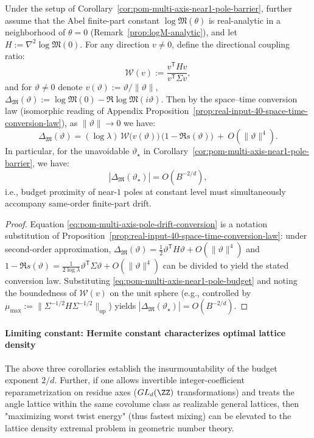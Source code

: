 \begin{corollary}\label{cor:pom-multi-axis-pole-drift-binding}
Under the setup of Corollary~\ref{cor:pom-multi-axis-near1-pole-barrier}, further assume that the Abel finite-part constant $\log\mathfrak{M}(\theta)$ is real-analytic in a neighborhood of $\theta=0$ (Remark~\ref{prop:logM-analytic}), and let
\(
H:=\nabla^2\log\mathfrak{M}(0)
\).
For any direction $v\neq 0$, define the directional coupling ratio:
\[
\mathcal{W}(v):=\frac{v^{\mathsf T}Hv}{v^{\mathsf T}\Sigma v},
\]
and for $\vartheta\neq 0$ denote $v(\vartheta):=\vartheta/\|\vartheta\|$, $\Delta_{\mathfrak{M}}(\vartheta):=\log\mathfrak{M}(0)-\Re\log\mathfrak{M}(i\vartheta)$.
Then by the space–time conversion law (isomorphic reading of Appendix Proposition~\ref{prop:real-input-40-space-time-conversion-law}), as $\|\vartheta\|\to 0$ we have:
\begin{equation}\label{eq:pom-multi-axis-pole-drift-conversion}
\Delta_{\mathfrak{M}}(\vartheta)
=(\log\lambda)\,\mathcal{W}\bigl(v(\vartheta)\bigr)\,\bigl(1-\Re s(\vartheta)\bigr)\ +\ O(\|\vartheta\|^4).
\end{equation}
In particular, for the unavoidable $\vartheta_\star$ in Corollary~\ref{cor:pom-multi-axis-near1-pole-barrier}, we have:
\[
|\Delta_{\mathfrak{M}}(\vartheta_\star)|=O(B^{-2/d}),
\]
i.e., budget proximity of near-$1$ poles at constant level must simultaneously accompany same-order finite-part drift.
\end{corollary}

\begin{proof}
Equation \eqref{eq:pom-multi-axis-pole-drift-conversion} is a notation substitution of Proposition~\ref{prop:real-input-40-space-time-conversion-law}: under second-order approximation,
\(
\Delta_{\mathfrak{M}}(\vartheta)=\frac12\vartheta^{\mathsf T}H\vartheta+O(\|\vartheta\|^4)
\)
and
\(
1-\Re s(\vartheta)=\frac{1}{2\log\lambda}\vartheta^{\mathsf T}\Sigma\vartheta+O(\|\vartheta\|^4)
\)
can be divided to yield the stated conversion law.
Substituting \eqref{eq:pom-multi-axis-near1-pole-budget} and noting the boundedness of $\mathcal{W}(v)$ on the unit sphere (e.g., controlled by $\mu_{\max}:=\|\Sigma^{-1/2}H\Sigma^{-1/2}\|_{\mathrm{op}}$) yields $|\Delta_{\mathfrak{M}}(\vartheta_\star)|=O(B^{-2/d})$.
\end{proof}

\paragraph{Limiting constant: Hermite constant characterizes optimal lattice density}
The above three corollaries establish the insurmountability of the budget exponent $2/d$.
Further, if one allows invertible integer-coefficient reparametrization on residue axes ($GL_d(\ZZ)$ transformations) and treats the angle lattice within the same covolume class as realizable general lattices, then "maximizing worst twist energy" (thus fastest mixing) can be elevated to the lattice density extremal problem in geometric number theory.

